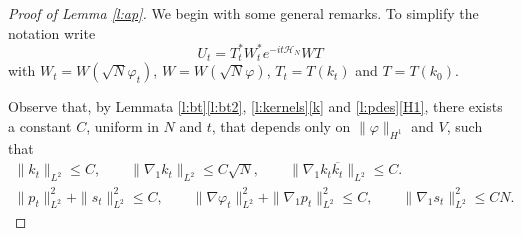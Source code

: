 \documentclass[11pt,a4paper]{scrartcl}
\begin{document}
\begin{proof}[Proof of Lemma \ref{l:ap}]
  We begin with some general remarks. To simplify the notation write
  \[
    U_t = T_t^* W_t^* e^{-it \mathcal{H}_N} WT
  \]
  with $W_t = W(\sqrt{N} \varphi_t)$, $W = W(\sqrt{N} \varphi)$, $T_t =
  T(k_t)$ and $T = T(k_0)$.


  Observe that, by Lemmata \ref{l:bt}\ref{l:bt2}, \ref{l:kernels}\ref{k} and
  \ref{l:pdes}\eqref{H1}, there exists a constant $C$, uniform in $N$ and $t$,
  that depends only on $\| \varphi \|_{H^1}$ and $V$, such that
  \begin{equation} \label{c2}
    \begin{gathered}
      \| k_t \|_{L^2} \le C, \qquad \| \nabla_1 k_t \|_{L^2} \le C \sqrt{N},
      \qquad \| \nabla_1 k_t \overline{k_t} \|_{L^2} \le C. \\
      \| p_t \|_{L^2}^2 + \| s_t \|_{L^2}^2 \le C, \qquad \| \nabla \varphi_t
      \|_{L^2}^2 + \| \nabla_1 p_t \|_{L^2}^2 \le C, \qquad \| \nabla_1 s_t
      \|_{L^2}^2 \le C N.
    \end{gathered}
  \end{equation}



\end{proof}
\end{document}
